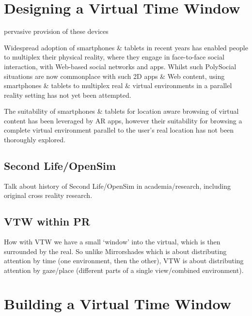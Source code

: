 
\section{Designing a Virtual Time Window}

pervasive provision of these devices 

Widespread adoption of smartphones \& tablets in recent years has enabled people to multiplex their physical reality, where they engage in face-to-face social interaction, with Web-based social networks and apps\cite{Accenture2012}. Whilst such PolySocial situations are now commonplace with such 2D apps \& Web content, using smartphones \& tablets to multiplex real \& virtual environments in a parallel reality setting has not yet been attempted.

The suitability of smartphones \& tablets for location aware browsing of virtual content has been leveraged by AR apps, however their suitability for browsing a complete virtual environment parallel to the user's real location has not been thoroughly explored.

\subsection{Second Life/OpenSim}

Talk about history of Second Life/OpenSim in academia/research, including original cross reality research.

\subsection{VTW within PR}

How with VTW we have a small `window' into the virtual, which is then surrounded by the real. So unlike Mirrorshades which is about distributing attention by time (one environment, then the other), VTW is about distributing attention by gaze/place (different parts of a single view/combined environment).


\section{Building a Virtual Time Window}

